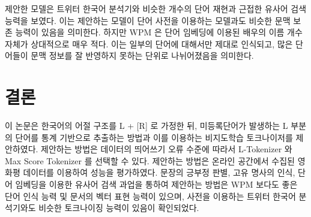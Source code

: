\documentclass[oneside, ko,phd]{snuthesis_utf8_kor}
\begin{document}
\begin{table}[ht]
\centering
\caption{단어 임베딩 벡터를 이용하여 검색된 배우 이름의 유사어 중 배우 이름인 비율}
\label{tab:word2vec_actor}
\end{table}

제안한 모델은 트위터 한국어 분석기와 비슷한 개수의 단어 재현과 근접한 유사어 검색 능력을 보였다.
이는 제안하는 모델이 단어 사전을 이용하는 모델과도 비슷한 문맥 보존 능력이 있음을 의미한다.
하지만 WPM 은 단어 임베딩에 이용된 배우의 이름 개수 자체가 상대적으로 매우 적다.
이는 일부의 단어에 대해서만 제대로 인식되고, 많은 단어들이 문맥 정보를 잘 반영하지 못하는 단위로 나뉘어졌음을 의미한다.


\section{결론} \label{word_extraction_conclusion}
이 논문은 한국어의 어절 구조를 L + [R] 로 가정한 뒤, 미등록단어가 발생하는 L 부분의 단어를 통계 기반으로 추출하는 방법과 이를 이용하는 비지도학습 토크나이저를 제안하였다.
제안하는 방법은 데이터의 띄어쓰기 오류 수준에 따라서 L-Tokenizer 와 Max Score Tokenizer 를 선택할 수 있다.
제안하는 방법은 온라인 공간에서 수집된 영화평 데이터를 이용하여 성능을 평가하였다.
문장의 긍부정 판별, 고유 명사의 인식, 단어 임베딩을 이용한 유사어 검색 과업을 통하여 제안하는 방법은 WPM 보다도 좋은 단어 인식 능력 및 문서의 벡터 표현 능력이 있으며, 사전을 이용하는 트위터 한국어 분석기와도 비슷한 토크나이징 능력이 있음이 확인되었다.
\end{document}
